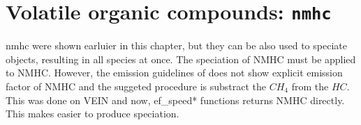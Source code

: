 \documentclass[12pt,graybox,envcountchap,sectrefs]{krantz}
\makeatletter
\newenvironment{Shaded}{\begin{snugshade}}{\end{snugshade}}
\newcommand{\KeywordTok}[1]{\textcolor[rgb]{0.13,0.29,0.53}{\textbf{#1}}}
\newcommand{\DataTypeTok}[1]{\textcolor[rgb]{0.13,0.29,0.53}{#1}}
\newcommand{\DecValTok}[1]{\textcolor[rgb]{0.00,0.00,0.81}{#1}}
\newcommand{\StringTok}[1]{\textcolor[rgb]{0.31,0.60,0.02}{#1}}
\newcommand{\CommentTok}[1]{\textcolor[rgb]{0.56,0.35,0.01}{\textit{#1}}}
\newcommand{\OtherTok}[1]{\textcolor[rgb]{0.56,0.35,0.01}{#1}}
\newcommand{\ControlFlowTok}[1]{\textcolor[rgb]{0.13,0.29,0.53}{\textbf{#1}}}
\newcommand{\OperatorTok}[1]{\textcolor[rgb]{0.81,0.36,0.00}{\textbf{#1}}}
\newcommand{\NormalTok}[1]{#1}
\newenvironment{kframe}{%
\medskip{}
\setlength{\fboxsep}{.8em}
 \def\at@end@of@kframe{}%
 \ifinner\ifhmode%
  \def\at@end@of@kframe{\end{minipage}}%
  \begin{minipage}{\columnwidth}%
 \fi\fi%
 \def\FrameCommand##1{\hskip\@totalleftmargin \hskip-\fboxsep
 \colorbox{shadecolor}{##1}\hskip-\fboxsep
     \hskip-\linewidth \hskip-\@totalleftmargin \hskip\columnwidth}%
 \MakeFramed {\advance\hsize-\width
   \@totalleftmargin\z@ \linewidth\hsize
   \@setminipage}}%
 {\par\unskip\endMakeFramed%
 \at@end@of@kframe}
\renewenvironment{Shaded}{\begin{kframe}}{\end{kframe}}
\theoremstyle{definition}
\theoremstyle{definition}
\theoremstyle{definition}
\theoremstyle{remark}
\makeatother
\begin{document}
\section{\texorpdfstring{Volatile organic compounds:
\texttt{nmhc}}{Volatile organic compounds: nmhc}}\label{volatile-organic-compounds-nmhc}

nmhc were shown earluier in this chapter, but they can be also used to
speciate objects, resulting in all species at once. The speciation of
NMHC must be applied to NMHC. However, the emission guidelines of
\citet{NtziachristosSamaras2016} does not show explicit emission factor
of NMHC and the suggeted procedure is substract the \(CH_4\) from the
\(HC\). This was done on VEIN and now, ef\_speed* functions returns NMHC
directly. This makes easier to produce speciation.

\begin{Shaded}
\end{Shaded}
\end{document}

